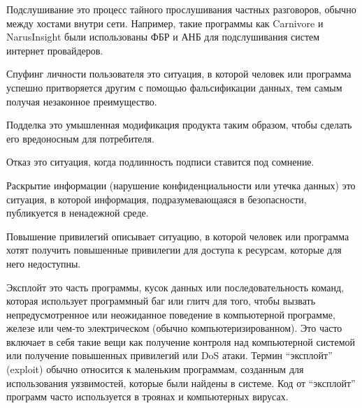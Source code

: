 
Подслушивание это процесс тайного прослушивания частных разговоров, обычно между хостами внутри сети. Например, такие программы как Carnivore и NarusInsight были использованы ФБР и АНБ для подслушивания систем интернет провайдеров. \\


Спуфинг личности пользователя это ситуация, в которой человек или программа успешно притворяется другим с помощью фальсификации данных, тем самым получая незаконное преимущество. \\


Подделка это умышленная модификация продукта таким образом, чтобы сделать его вредоносным для потребителя. \\


Отказ это ситуация, когда подлинность подписи ставится под сомнение. \\


Раскрытие информации (нарушение конфиденциальности или утечка данных) это ситуация, в которой информация, подразумевающаяся в безопасности, публикуется в ненадежной среде. \\


Повышение привилегий описывает ситуацию, в которой человек или программа хотят получить повышенные привилегии для доступа к ресурсам, которые для него недоступны. \\


Эксплойт это часть программы, кусок данных или последовательность команд, которая использует программный баг или глитч для того, чтобы вызвать непредусмотренное или неожиданное поведение в компьютерной программе, железе или чем-то электрическом (обычно компьютеризированном). Это часто включает в себя такие вещи как получение контроля над компьютерной системой или получение повышенных привилегий или DoS атаки. Термин ``эксплойт'' (exploit) обычно относится к маленьким программам, созданным для использования уязвимостей, которые были найдены в системе. Код от ``эксплойт'' программ часто используется в троянах и компьютерных вирусах. \\

